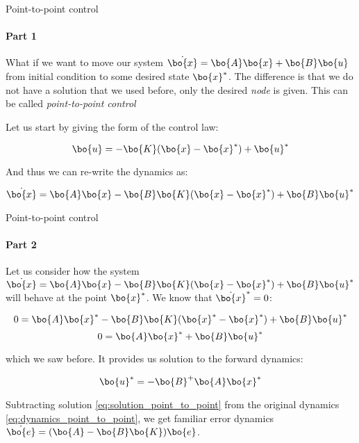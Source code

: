 \documentclass{beamer}
\begin{document}
\begin{frame}{Point-to-point control}
\framesubtitle{Part 1}
\begin{flushleft}

What if we want to move our system $\dot{\bo{x}} = \bo{A}\bo{x} + \bo{B}\bo{u}$ from initial condition to some desired state $\bo{x}^*$. The difference is that we do not have a solution that we used before, only the desired \emph{node} is given. This can be called \emph{point-to-point control}

\bigskip

Let us start by giving the form of the control law:

\begin{equation}
    \bo{u} = -\bo{K}(\bo{x} - \bo{x}^*) + \bo{u}^*
\end{equation}

And thus we can re-write the dynamics as:

\begin{equation}
\label{eq:dynamics_point_to_point}
    \dot{\bo{x}} = \bo{A}\bo{x} - \bo{B}\bo{K}(\bo{x} - \bo{x}^*) + \bo{B}\bo{u}^*
\end{equation}

\end{flushleft}
\end{frame}




\begin{frame}{Point-to-point control}
\framesubtitle{Part 2}
\begin{flushleft}

Let us consider how the system $\dot{\bo{x}} = \bo{A}\bo{x} - \bo{B}\bo{K}(\bo{x} - \bo{x}^*) + \bo{B}\bo{u}^*$ will behave at the point $\bo{x}^*$. We know that $\dot{\bo{x}}^* = 0$:

\begin{equation}
    0 = \bo{A}\bo{x}^* - \bo{B}\bo{K}(\bo{x}^* - \bo{x}^*) + \bo{B}\bo{u}^*
\end{equation}
\begin{equation}
\label{eq:solution_point_to_point}
    0 = \bo{A}\bo{x}^* + \bo{B}\bo{u}^*
\end{equation}

which we saw before. It provides us solution to the forward dynamics:

\begin{equation}
    \bo{u}^* = -\bo{B}^+\bo{A}\bo{x}^*
\end{equation}

Subtracting solution \eqref{eq:solution_point_to_point} from the original dynamics \eqref{eq:dynamics_point_to_point}, we get familiar error dynamics $\dot{\bo{e}} = (\bo{A} - \bo{B}\bo{K})\bo{e}$.

\end{flushleft}
\end{frame}
\end{document}
